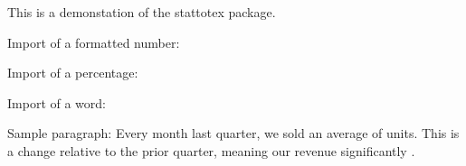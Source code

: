 \documentclass{article}
\begin{document}
    This is a demonstation of the stattotex package.

    Import of a formatted number: \FormatTest

    Import of a percentage: \PctTest

    Import of a word: \WordTest

    Sample paragraph: Every month last quarter, we sold an average of \FormatTest \space units. This is a \PctTest \space change relative to the prior quarter, meaning our revenue significantly \WordTest.
\end{document}
